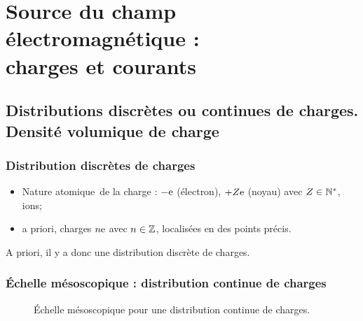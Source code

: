 \section[Charges et courants]{Source du champ électromagnétique :\\charges et courants}

    \subsection[Distributions discrètes ou continues de charges]{Distributions discrètes ou continues de charges. Densité volumique de charge}

        \subsubsection{Distribution discrètes de charges}

            \begin{itemize}[label=$\longrightarrow$]
                \item Nature \og atomique\fg~de la charge : $-\mathrm{e}$ (électron), $+Z\mathrm{e}$ (noyau) avec $Z\in\mathbb{N}^{*}$, ions;
                \item a priori, charges $n\mathrm{e}$ avec $n\in\mathbb{Z}$, localisées en des points précis. 
            \end{itemize}

            A priori, il y a donc une distribution discrète de charges.

        \subsubsection{Échelle mésoscopique : distribution continue de charges}

            \begin{figure}[h!]
                \centering
                \caption[Échelle mésoscopique pour une distribution de charges.]{Échelle mésoscopique pour une distribution continue de charges.}    
                \label{fig:echelle_meso_distribution_continue_charge}
            \end{figure}

